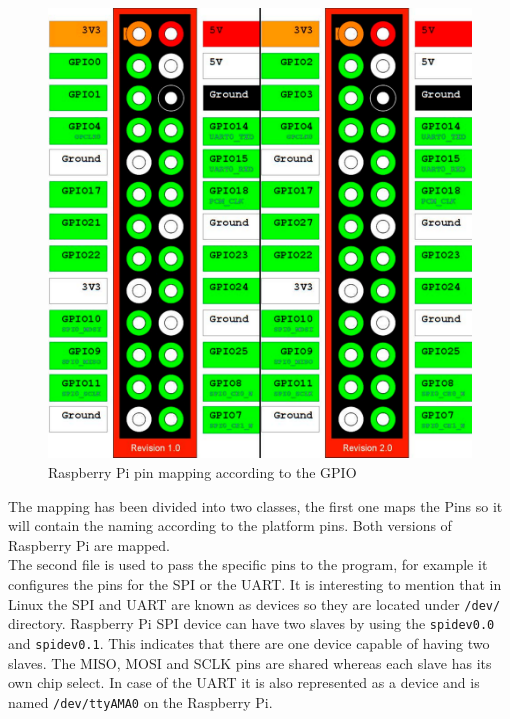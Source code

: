\begin{figure}[H]\begin{center}
 \centering
  \captionsetup{justification=centering}
  \includegraphics[scale=0.30]{pictures/iosharp/mapping-raspberrypi}
  \caption{Raspberry Pi pin mapping according to the GPIO\label{fig:mapping-rpi}}
\end{center}\end{figure}

The mapping has been divided into two classes, the first one maps the Pins so it will contain the naming according to the platform pins. Both versions of Raspberry Pi are mapped.
\\
The second file is used to pass the specific pins to the program, for example it configures the pins for the SPI or the UART. It is interesting to mention that in Linux the SPI and UART are known as devices so they are located under \verb!/dev/! directory. Raspberry Pi SPI device can have two slaves by using the \verb!spidev0.0! and \verb!spidev0.1!. This indicates that there are one device capable of having two slaves. The MISO, MOSI and SCLK pins are shared whereas each slave has its own chip select. In case of the UART it is also represented as a device and is named \verb!/dev/ttyAMA0! on the Raspberry Pi.
